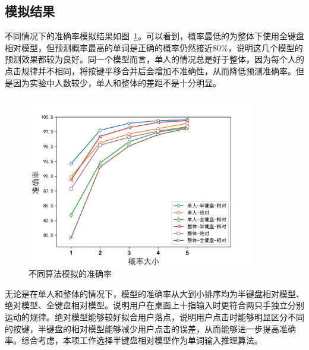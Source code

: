 \subsection{模拟结果}
不同情况下的准确率模拟结果如图~\ref{fig:simulation}。可以看到，概率最低的为整体下使用全键盘相对模型，但预测概率最高的单词是正确的概率仍然接近80\%，说明这几个模型的预测效果都较为良好。同一个模型而言，单人的情况总是好于整体，因为每个人的点击规律并不相同，将按键平移合并后会增加不准确性，从而降低预测准确率。但是因为实验中人数较少，单人和整体的差距不是十分明显。

\begin{figure}[h] %
    \centering
    \includegraphics[width=10cm]{figures/acc.jpg}
    \caption{不同算法模拟的准确率}
    \label{fig:simulation}
\end{figure}

无论是在单人和整体的情况下，模型的准确率从大到小排序均为半键盘相对模型、绝对模型、全键盘相对模型。说明用户在桌面上十指输入时更符合两只手独立分别运动的规律。绝对模型能够较好拟合用户落点，说明用户点击时能够明显区分不同的按键，半键盘的相对模型能够减少用户点击的误差，从而能够进一步提高准确率。综合考虑，本项工作选择半键盘相对模型作为单词输入推理算法。